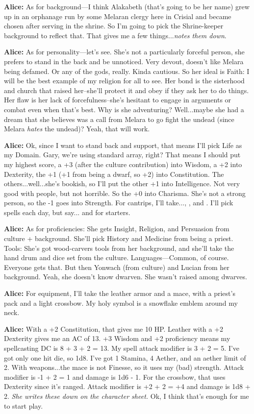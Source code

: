 \textbf{Alice:} As for background---I think Alakabeth (that's going to be her name) grew up in an orphanage run by some Melaran clergy here in Crisial and became chosen after serving in the shrine. So I'm going to pick the Shrine-keeper background to reflect that. That gives me a few things...\textit{notes them down}.

\textbf{Alice:} As for personality---let's see. She's not a particularly forceful person, she prefers to stand in the back and be unnoticed. Very devout, doesn't like Melara being defamed. Or any of the gods, really. Kinda cautious. So her ideal is Faith: I will be the best example of my religion for all to see. Her bond is the sisterhood and church that raised her--she'll protect it and obey if they ask her to do things. Her flaw is her lack of forcefulness--she's hesitant to engage in arguments or combat even when that's best. Why is she adventuring? Well...maybe she had a dream that she believes was a call from Melara to go fight the undead (since Melara \textit{hates} the undead)? Yeah, that will work.

\textbf{Alice:} Ok, since I want to stand back and support, that means I'll pick Life as my Domain. Gary, we're using standard array, right? That means I should put my highest score, a +3 (after the culture contribution) into Wisdom, a +2 into Dexterity, the +1 (+1 from being a dwarf, so +2) into Constitution. The others...well...she's bookish, so I'll put the other +1 into Intelligence. Not very good with people, but not horrible. So the +0 into Charisma. She's not a strong person, so the -1 goes into Strength. For cantrips, I'll take..., , and . I'll pick spells each day, but say... and  for starters.

\textbf{Alice:} As for proficiencies: She gets Insight, Religion, and Persuasion from culture + background. She'll pick History and Medicine from being a priest. Tools: She's got wood-carvers tools from her background, and she'll take the hand drum and dice set from the culture. Languages---Common, of course. Everyone gets that. But then Yonwach (from culture) and Lucian from her background. Yeah, she doesn't know dwarven. She wasn't raised among dwarves.

\textbf{Alice:} For equipment, I'll take the leather armor and a mace, with a priest's pack and a light crossbow. My holy symbol is a snowflake emblem around my neck.

\textbf{Alice:} With a +2 Constitution, that gives me 10 HP. Leather with a +2 Dexterity gives me an AC of 13. +3 Wisdom and +2 proficiency means my spellcasting DC is 8 + 3 + 2 = 13. My spell attack modifier is 3 + 2 = 5. I've got only one hit die, so 1d8. I've got 1 Stamina, 4 Aether, and an aether limit of 2. With weapons...the mace is not Finesse, so it uses my (bad) strength. Attack modifier is -1 + 2 = 1 and damage is 1d6 - 1. For the crossbow, that uses Dexterity since it's ranged. Attack modifier is +2 + 2 = +4 and damage is 1d8 + 2. \textit{She writes these down on the character sheet.} Ok, I think that's enough for me to start play.

